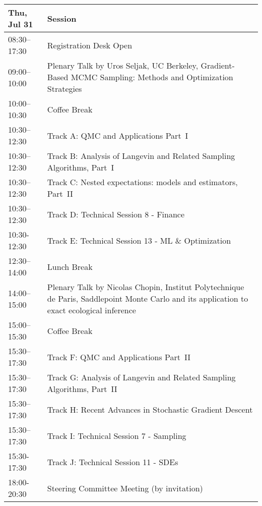 \begin{table}
{\footnotesize
\begin{tabularx}{\textwidth}{>{\hsize=0.32\hsize}X|>{\hsize=1.7\hsize}X}
\hline
\textbf{Thu, Jul 31} & \textbf{Session} \\
\hline
\cellcolor{\EmptyColor}08:30–17:30 & \cellcolor{\EmptyColor}Registration Desk Open \\
\cellcolor{\PlenaryColor}09:00–10:00 & \cellcolor{\PlenaryColor}Plenary Talk by Uros Seljak, UC Berkeley, Gradient-Based MCMC Sampling: Methods and Optimization Strategies \\
\cellcolor{\EmptyColor}10:00–10:30 & \cellcolor{\EmptyColor}Coffee Break \\
\cellcolor{\SessionTitleColor}10:30–12:30 & \cellcolor{\SessionTitleColor}Track A: QMC and Applications Part~I \\
\cellcolor{\SessionTitleColor}10:30–12:30 & \cellcolor{\SessionTitleColor}Track B: Analysis of Langevin and Related Sampling Algorithms, Part~I \\
\cellcolor{\SessionTitleColor}10:30–12:30 & \cellcolor{\SessionTitleColor}Track C: Nested expectations: models and estimators, Part~II \\
\cellcolor{\SessionLightColor}10:30–12:30 & \cellcolor{\SessionLightColor}Track D: Technical Session 8 - Finance \\
\cellcolor{\SessionLightColor}10:30-12:30 & \cellcolor{\SessionLightColor}Track E: Technical Session 13 - ML \& Optimization \\
\cellcolor{\EmptyColor}12:30–14:00 & \cellcolor{\EmptyColor}Lunch Break \\
\cellcolor{\PlenaryColor}14:00–15:00 & \cellcolor{\PlenaryColor}Plenary Talk by Nicolas Chopin, Institut Polytechnique de Paris, Saddlepoint Monte Carlo and its application to exact ecological inference \\
\cellcolor{\EmptyColor}15:00–15:30 & \cellcolor{\EmptyColor}Coffee Break \\
\cellcolor{\SessionTitleColor}15:30–17:30 & \cellcolor{\SessionTitleColor}Track F: QMC and Applications Part~II \\
\cellcolor{\SessionTitleColor}15:30–17:30 & \cellcolor{\SessionTitleColor}Track G: Analysis of Langevin and Related Sampling Algorithms, Part~II \\
\cellcolor{\SessionTitleColor}15:30–17:30 & \cellcolor{\SessionTitleColor}Track H: Recent Advances in Stochastic Gradient Descent \\
\cellcolor{\SessionLightColor}15:30–17:30 & \cellcolor{\SessionLightColor}Track I: Technical Session 7 - Sampling \\
\cellcolor{\SessionLightColor}15:30-17:30 & \cellcolor{\SessionLightColor}Track J: Technical Session 11 - SDEs \\
\cellcolor{\SessionTitleColor}18:00-20:30 & \cellcolor{\SessionTitleColor}Steering Committee Meeting (by invitation) \\
\hline
\end{tabularx}
}
\end{table}

